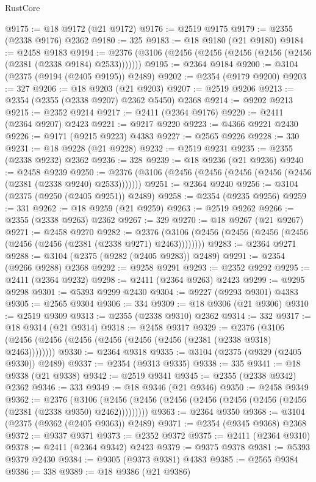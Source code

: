 \begin{lexlean}{RustCore}
\begin{coremodule}
@9175 := @18 @9172 (@21 @9172)
@9176 := @2519 @9175
@9179 := @2355 (@2338 @9176) @2362
@9180 := 325
@9183 := @18 @9180 (@21 @9180)
@9184 := @2458 @9183
@9194 := @2376 (@3106 (@2456 (@2456 (@2456 (@2456 (@2456 (@2381 (@2338 @9184) @2533)))))))
@9195 := @2364 @9184
@9200 := @3104 (@2375 (@9194 (@2405 @9195)) @2489)
@9202 := @2354 (@9179 @9200)
@9203 := 327
@9206 := @18 @9203 (@21 @9203)
@9207 := @2519 @9206
@9213 := @2354 (@2355 (@2338 @9207) @2362 @5450) @2368
@9214 := @9202 @9213
@9215 := @2352 @9214
@9217 := @2411 (@2364 @9176)
@9220 := @2411 (@2364 @9207) @2423
@9221 := @9217 @9220
@9223 := @4366 @9221 @2430
@9226 := @9171 (@9215 @9223) @4383
@9227 := @2565 @9226
@9228 := 330
@9231 := @18 @9228 (@21 @9228)
@9232 := @2519 @9231
@9235 := @2355 (@2338 @9232) @2362
@9236 := 328
@9239 := @18 @9236 (@21 @9236)
@9240 := @2458 @9239
@9250 := @2376 (@3106 (@2456 (@2456 (@2456 (@2456 (@2456 (@2381 (@2338 @9240) @2533)))))))
@9251 := @2364 @9240
@9256 := @3104 (@2375 (@9250 (@2405 @9251)) @2489)
@9258 := @2354 (@9235 @9256)
@9259 := 331
@9262 := @18 @9259 (@21 @9259)
@9263 := @2519 @9262
@9266 := @2355 (@2338 @9263) @2362
@9267 := 329
@9270 := @18 @9267 (@21 @9267)
@9271 := @2458 @9270
@9282 := @2376 (@3106 (@2456 (@2456 (@2456 (@2456 (@2456 (@2456 (@2381 (@2338 @9271) @2463))))))))
@9283 := @2364 @9271
@9288 := @3104 (@2375 (@9282 (@2405 @9283)) @2489)
@9291 := @2354 (@9266 @9288) @2368
@9292 := @9258 @9291
@9293 := @2352 @9292
@9295 := @2411 (@2364 @9232)
@9298 := @2411 (@2364 @9263) @2423
@9299 := @9295 @9298
@9301 := @5393 @9299 @2430
@9304 := @9227 (@9293 @9301) @4383
@9305 := @2565 @9304
@9306 := 334
@9309 := @18 @9306 (@21 @9306)
@9310 := @2519 @9309
@9313 := @2355 (@2338 @9310) @2362
@9314 := 332
@9317 := @18 @9314 (@21 @9314)
@9318 := @2458 @9317
@9329 := @2376 (@3106 (@2456 (@2456 (@2456 (@2456 (@2456 (@2456 (@2381 (@2338 @9318) @2463))))))))
@9330 := @2364 @9318
@9335 := @3104 (@2375 (@9329 (@2405 @9330)) @2489)
@9337 := @2354 (@9313 @9335)
@9338 := 335
@9341 := @18 @9338 (@21 @9338)
@9342 := @2519 @9341
@9345 := @2355 (@2338 @9342) @2362
@9346 := 333
@9349 := @18 @9346 (@21 @9346)
@9350 := @2458 @9349
@9362 := @2376
    (@3106 (@2456 (@2456 (@2456 (@2456 (@2456 (@2456 (@2456 (@2381 (@2338 @9350) @2462)))))))))
@9363 := @2364 @9350
@9368 := @3104 (@2375 (@9362 (@2405 @9363)) @2489)
@9371 := @2354 (@9345 @9368) @2368
@9372 := @9337 @9371
@9373 := @2352 @9372
@9375 := @2411 (@2364 @9310)
@9378 := @2411 (@2364 @9342) @2423
@9379 := @9375 @9378
@9381 := @5393 @9379 @2430
@9384 := @9305 (@9373 @9381) @4383
@9385 := @2565 @9384
@9386 := 338
@9389 := @18 @9386 (@21 @9386)

\end{coremodule}
\end{lexlean}
